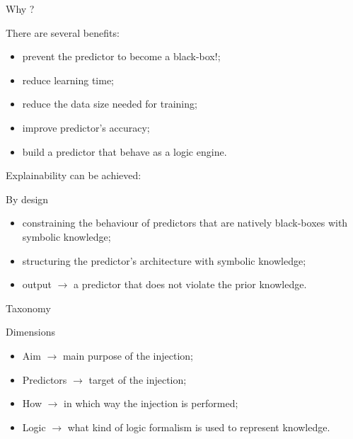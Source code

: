 \documentclass[presentation]{beamer}\mode<presentation>{\usetheme{AMSBolognaFC}}
\begin{document}
\begin{frame}[allowframebreaks]{Why \ski?}
    \begin{block}{There are several benefits:}
        \begin{itemize}
            \item prevent the predictor to become a black-box\alert{!};
            \item reduce learning time;
            \item reduce the data size needed for training;
            \item improve predictor's accuracy;
            \item build a predictor that behave as a logic engine.
        \end{itemize}
    \end{block}

     \framebreak

    Explainability  can be achieved:
    
    \begin{block}{By design}
        \begin{itemize}
            \item constraining the behaviour of predictors that are natively black-boxes with symbolic knowledge;
            \item structuring the predictor's architecture with symbolic knowledge;
            \item output $\rightarrow$ a predictor that does not violate the prior knowledge.
        \end{itemize}
    \end{block}
    
\end{frame}

\begin{frame}[c]{Taxonomy}
    \begin{block}{Dimensions}
        \begin{itemize}
            \item Aim $\rightarrow$ main purpose of the injection;
            \item Predictors $\rightarrow$ target of the injection;
            \item How $\rightarrow$ in which way the injection is performed;
            \item Logic $\rightarrow$ what kind of logic formalism is used to represent knowledge.
        \end{itemize}
    \end{block}
\end{frame}
    
\end{document}
